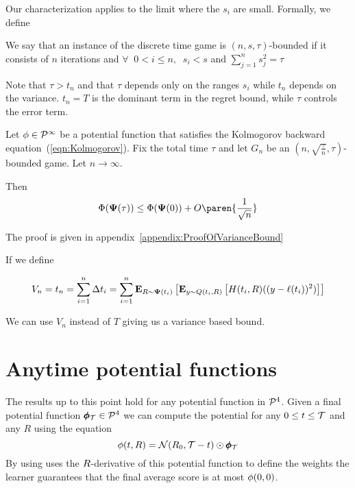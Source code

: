 \documentclass{article}[12pt]
\begin{document}
Our characterization applies to the limit where the $s_i$ are small. Formally, we define
\begin{definition}
We say that an instance of the discrete time game is
$(n,s,\tau)$-bounded if it consists of $n$ iterations and $\forall\;\; 0<i\leq n,\;\; s_i < s$ and $\sum_{j=1}^n s_j^2=\tau$
\end{definition}

Note that $\tau>t_n$ and that $\tau$ depends only on the ranges $s_i$
while $t_n$ depends on the variance. $t_n = T$ 
is the dominant term in the regret bound, while $\tau$ controls the
error term.

\newpage

\begin{theorem} \label{thm:variancebound} Let $\phi \in {\cal P}^{\infty}$
  be a potential function that satisfies the Kolmogorov backward
  equation~(\ref{eqn:Kolmogorov}).
  Fix the total time $\tau$ and let $G_n$ be an $(n,
  \sqrt{\frac{\tau}{n}},\tau)$-bounded game. Let $n \to \infty$.

Then 
$$\score(\state(\tau)) \leq \score(\state(0))+O\paren{\frac{1}{\sqrt{n}}}$$
\end{theorem}

The proof is given in appendix~\ref{appendix:ProofOfVarianceBound}

If we define

\begin{equation} \label{eqn:Vn}
  V_n = t_n = \sum_{i=1}^n \Delta t_i= 
  \sum_{i=1}^n {\bf E}_{R \sim {\bf \Psi}(t_i)}\left[ {\bf E}_{y \sim Q(t_i,R)}\left[ H(t_i,R) ((y-\ell(t_i))^2) \right] \right]
\end{equation}

We can use $V_n$ instead of $T$ giving us a variance based bound.

  

\section{Anytime potential functions}

The results up to this point hold for any potential function in
${\cal P}^{4}$. Given a final potential function $\pmb{\phi}_{\mathcal{T}} \in {\cal P}^{4}$ we
can compute the potential for any $0 \leq t \leq \mathcal{T}$ and any $R$ using the equation 
\begin{equation} \label{eqn:convol-with-normal}
\phi(t,R)={\cal N}(R_0,\mathcal{T}-t) \odot \pmb{\phi}_{\mathcal{T}}
\end{equation}
By using uses the $R$-derivative of this potential function to define
the weights the learner guarantees that the final average score is at
most $\phi(0,0)$.
\end{document}
